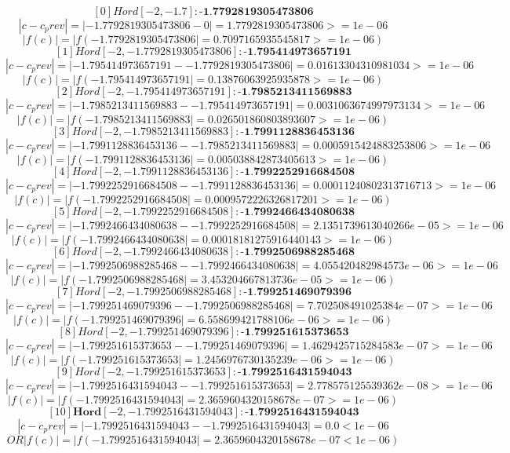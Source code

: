 \documentclass{article}
\begin{document}
    $$ [0] Hord [-2, -1.7]: \textbf{-1.7792819305473806} $$ $$ |c - c_prev| = |-1.7792819305473806 - 0| = 1.7792819305473806 >= 1e-06 $$ $$ |f(c)| = |f(-1.7792819305473806| = 0.7097165935545817 >= 1e-06) $$
    $$ [1] Hord [-2, -1.7792819305473806]: \textbf{-1.795414973657191} $$ $$ |c - c_prev| = |-1.795414973657191 - -1.7792819305473806| = 0.01613304310981034 >= 1e-06 $$ $$ |f(c)| = |f(-1.795414973657191| = 0.13876063925935878 >= 1e-06) $$
    $$ [2] Hord [-2, -1.795414973657191]: \textbf{-1.7985213411569883} $$ $$ |c - c_prev| = |-1.7985213411569883 - -1.795414973657191| = 0.0031063674997973134 >= 1e-06 $$ $$ |f(c)| = |f(-1.7985213411569883| = 0.026501860803893607 >= 1e-06) $$
    $$ [3] Hord [-2, -1.7985213411569883]: \textbf{-1.7991128836453136} $$ $$ |c - c_prev| = |-1.7991128836453136 - -1.7985213411569883| = 0.0005915424883253806 >= 1e-06 $$ $$ |f(c)| = |f(-1.7991128836453136| = 0.005038842873405613 >= 1e-06) $$
    $$ [4] Hord [-2, -1.7991128836453136]: \textbf{-1.7992252916684508} $$ $$ |c - c_prev| = |-1.7992252916684508 - -1.7991128836453136| = 0.00011240802313716713 >= 1e-06 $$ $$ |f(c)| = |f(-1.7992252916684508| = 0.0009572226326817201 >= 1e-06) $$
    $$ [5] Hord [-2, -1.7992252916684508]: \textbf{-1.7992466434080638} $$ $$ |c - c_prev| = |-1.7992466434080638 - -1.7992252916684508| = 2.1351739613040266e-05 >= 1e-06 $$ $$ |f(c)| = |f(-1.7992466434080638| = 0.00018181275916440143 >= 1e-06) $$
    $$ [6] Hord [-2, -1.7992466434080638]: \textbf{-1.7992506988285468} $$ $$ |c - c_prev| = |-1.7992506988285468 - -1.7992466434080638| = 4.055420482984573e-06 >= 1e-06 $$ $$ |f(c)| = |f(-1.7992506988285468| = 3.453204667813736e-05 >= 1e-06) $$
    $$ [7] Hord [-2, -1.7992506988285468]: \textbf{-1.799251469079396} $$ $$ |c - c_prev| = |-1.799251469079396 - -1.7992506988285468| = 7.702508491025384e-07 >= 1e-06 $$ $$ |f(c)| = |f(-1.799251469079396| = 6.558699421788106e-06 >= 1e-06) $$
    $$ [8] Hord [-2, -1.799251469079396]: \textbf{-1.799251615373653} $$ $$ |c - c_prev| = |-1.799251615373653 - -1.799251469079396| = 1.4629425715284583e-07 >= 1e-06 $$ $$ |f(c)| = |f(-1.799251615373653| = 1.2456976730135239e-06 >= 1e-06) $$
    $$ [9] Hord [-2, -1.799251615373653]: \textbf{-1.7992516431594043} $$ $$ |c - c_prev| = |-1.7992516431594043 - -1.799251615373653| = 2.778575125539362e-08 >= 1e-06 $$ $$ |f(c)| = |f(-1.7992516431594043| = 2.3659604320158678e-07 >= 1e-06) $$
    $$ [10] \textbf{Hord} [-2, -1.7992516431594043]: \textbf{-1.7992516431594043} $$ $$ |c - c_prev| = |-1.7992516431594043 - -1.7992516431594043| = 0.0 < 1e-06 $$ $$ OR |f(c)| = |f(-1.7992516431594043| = 2.3659604320158678e-07 < 1e-06) $$
\end{document}
